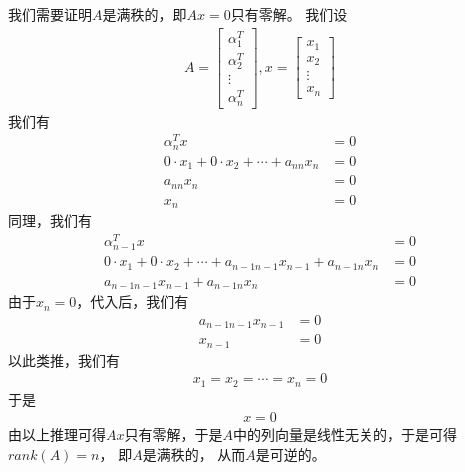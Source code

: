 \documentclass{article}
\begin{document}
\begin{itemize}
        我们需要证明$A$是满秩的，即$A x = 0$只有零解。
        我们设
        \begin{align*}
          A = \begin{bmatrix}
                \alpha_1^T \\
                \alpha_2^T \\
                \vdots     \\
                \alpha_n^T
              \end{bmatrix},
          x = \begin{bmatrix}
                x_1    \\
                x_2    \\
                \vdots \\
                x_n
              \end{bmatrix}
        \end{align*}
        我们有
        \begin{align*}
          \alpha_n^T x                                    & = 0 \\
          0 \cdot x_1 + 0 \cdot x_2 + \cdots + a_{nn} x_n & = 0 \\
          a_{nn}x_n                                       & = 0 \\
          x_n                                             & = 0
        \end{align*}
        同理，我们有
        \begin{align*}
          \alpha_{n-1}^T x                                                               & = 0 \\
          0 \cdot x_1 + 0 \cdot x_2 + \cdots + a_{{n-1}{n-1}} x_{n-1} + a_{{n-1}{n}} x_n & = 0 \\
          a_{{n-1}{n-1}} x_{n-1} + a_{{n-1}{n}} x_n                                      & = 0
        \end{align*}
        由于$x_n = 0$，代入后，我们有
        \begin{align*}
          a_{{n-1}{n-1}} x_{n-1} & = 0 \\
          x_{n - 1}              & = 0
        \end{align*}
        以此类推，我们有
        \begin{align*}
          x_1 = x_2 = \cdots = x_n = 0
        \end{align*}
        于是
        \begin{align*}
          x = 0
        \end{align*}
        由以上推理可得$Ax$只有零解，于是$A$中的列向量是线性无关的，于是可得$rank(A) = n$，
        即$A$是满秩的，
        从而$A$是可逆的。


\end{itemize}
\end{document}
